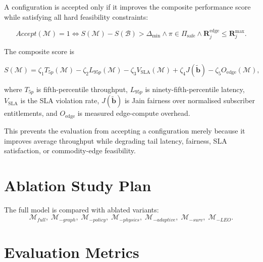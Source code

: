 A configuration is accepted only if it improves the composite performance score
while satisfying all hard feasibility constraints:

\begin{equation}
Accept(\mathcal{M})=1
\iff
S(\mathcal{M})-S(\mathcal{B})>\Delta_{\min}
\land
\pi\in\Pi_{\mathrm{safe}}
\land
\mathbf{R}^{\mathrm{edge}}_j\le\mathbf{R}^{\max}_j.
\label{eq:acceptance-rule-clean}
\end{equation}

The composite score is

\begin{equation}
S(\mathcal{M})
=
\zeta_1T_{5p}(\mathcal{M})
-
\zeta_2L_{95p}(\mathcal{M})
-
\zeta_3V_{\mathrm{SLA}}(\mathcal{M})
+
\zeta_4J(\tilde{\mathbf{b}})
-
\zeta_5O_{\mathrm{edge}}(\mathcal{M}),
\label{eq:composite-score}
\end{equation}

where \(T_{5p}\) is fifth-percentile throughput, \(L_{95p}\) is
ninety-fifth-percentile latency, \(V_{\mathrm{SLA}}\) is the SLA violation
rate, \(J(\tilde{\mathbf{b}})\) is Jain fairness over normalised subscriber
entitlements, and \(O_{\mathrm{edge}}\) is measured edge-compute overhead.

This prevents the evaluation from accepting a configuration merely because it
improves average throughput while degrading tail latency, fairness, SLA
satisfaction, or commodity-edge feasibility.

\section{Ablation Study Plan}
\label{sec:ablation}

The full model is compared with ablated variants:
\begin{equation}
  \mathcal{M}_{full},\;\mathcal{M}_{-graph},\;\mathcal{M}_{-policy},\;\mathcal{M}_{-physics},\;\mathcal{M}_{-adaptive},\;\mathcal{M}_{-surv},\;\mathcal{M}_{-LEO}.
  \label{eq:ablation}
\end{equation}

\section{Evaluation Metrics}
\label{sec:metrics}

